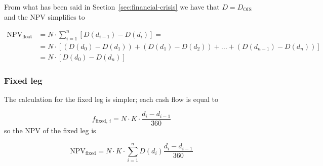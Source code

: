 From what has been said in Section~\ref{sec:financial-crisis} we have that $D = D_{\mathrm{OIS}}$ and the NPV simplifies to

\begin{equation}
  \begin{split}
    \mathrm{NPV}_{\mathrm{float}} & = N\cdot\sum_{i=1}^{n}[D(d_{i-1}) - D(d_i)] =  \\
    &= N\cdot[(D(d_{0}) - D(d_{1})) + (D(d_{1}) - D(d_{2})) + ... + (D(d_{n-1}) - D(d_{n}))]\\
    &= N \cdot [D(d_0) - D(d_n)]
  \end{split}
\end{equation}

\subsubsection{Fixed leg}\label{fixed-leg}

The calculation for the fixed leg is simpler; each cash flow is equal to

\begin{equation}
f_{\mathrm{fixed},~i}=N\cdot K\cdot \frac{d_i - d_{i-1}}{360}
\end{equation}
so the NPV of the fixed leg is

\begin{equation}
\mathrm{NPV}_{\mathrm{fixed}} = N\cdot K\cdot \sum_{i=1}^{n}D(d_{i})\frac{d_i - d_{i-1}}{360}
\end{equation}


